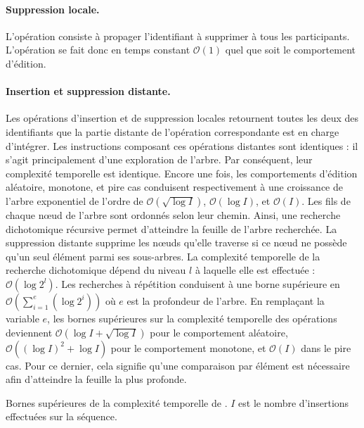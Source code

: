 \paragraph{Suppression locale.} L'opération consiste à propager l'identifiant à
supprimer à tous les participants. L'opération se fait donc en temps constant
$\mathcal{O}(1)$ quel que soit le comportement d'édition.

\paragraph{Insertion et suppression distante.} Les opérations d'insertion et de
suppression locales retournent toutes les deux des identifiants que la partie
distante de l'opération correspondante est en charge d'intégrer.  Les
instructions composant ces opérations distantes sont identiques : il s'agit
principalement d'une exploration de l'arbre. Par conséquent, leur complexité
temporelle est identique. Encore une fois, les comportements d'édition
aléatoire, monotone, et pire cas conduisent respectivement à une croissance de
l'arbre exponentiel de l'ordre de $\mathcal{O}(\sqrt{\log I})$,
$\mathcal{O}(\log I)$, et $\mathcal{O}(I)$.  Les fils de chaque nœud de l'arbre
sont ordonnés selon leur chemin. Ainsi, une recherche dichotomique récursive
permet d'atteindre la feuille de l'arbre recherchée. La suppression distante
supprime les nœuds qu'elle traverse si ce nœud ne possède qu'un seul élément
parmi ses sous-arbres. La complexité temporelle de la recherche dichotomique
dépend du niveau $l$ à laquelle elle est effectuée : $\mathcal{O}(\log 2^l)$.
Les recherches à répétition conduisent à une borne supérieure en
$\mathcal{O}(\textstyle\sum\nolimits_{i=1}^{e}(\log 2^i))$ où $e$ est la
profondeur de l'arbre. En remplaçant la variable $e$, les bornes supérieures sur
la complexité temporelle des opérations deviennent
$\mathcal{O}(\log I + \sqrt{\log I})$ pour le comportement aléatoire,
$\mathcal{O}((\log I)^2 + \log I)$ pour le comportement monotone, et
$\mathcal{O}(I)$ dans le pire cas. Pour ce dernier, cela signifie qu'une
comparaison par élément est nécessaire afin d'atteindre la feuille la plus
profonde.

\begin{table}
  \begin{center}
    \caption[Bornes supérieures de la complexité temporelle de \LSEQ]
    {\label{repl:table:lseqtime} Bornes supérieures de la complexité temporelle
      de \LSEQ. $I$ est le nombre d'insertions effectuées sur la séquence.}
    
  \end{center}
\end{table}


